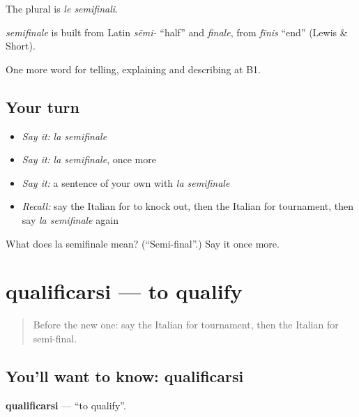 The plural is \emph{le semifinali}.

\begin{cousinweb}
\emph{semifinale} is built from Latin \emph{sēmi-} \textquotedblleft{}half\textquotedblright{} and \emph{finale}, from \emph{fīnis} \textquotedblleft{}end\textquotedblright{} (Lewis \& Short).
\end{cousinweb}

\begin{grammarlens}[title={What you've built}]
One more word for telling, explaining and describing at B1.
\end{grammarlens}

\subsection*{Your turn}
\begin{itemize}
\raggedright
  \item \emph{Say it:} \emph{la semifinale}
  \item \emph{Say it:} \emph{la semifinale}, once more
  \item \emph{Say it:} a sentence of your own with \emph{la semifinale}
  \item \emph{Recall:} say the Italian for to knock out, then the Italian for tournament, then say \emph{la semifinale} again
\end{itemize}

\begin{tcolorbox}[breakable,colback=teal!4,colframe=teal!35!black,title={Before you move on}]
What does la semifinale mean? (\textquotedblleft{}Semi-final\textquotedblright{}.) Say it once more.
\end{tcolorbox}
\section[qualificarsi]{qualificarsi — to qualify}

\label{lesson:IT-C512-qualificarsi}



\begin{quote}
Before the new one: say the Italian for tournament, then the Italian for semi-final.
\end{quote}

\subsection*{You'll want to know: qualificarsi}
\textbf{qualificarsi} — \textquotedblleft{}to qualify\textquotedblright{}.

